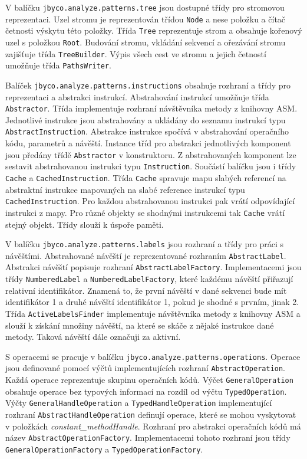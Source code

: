 V balíčku \texttt{jbyco.analyze.patterns.tree} jsou dostupné třídy pro stromovou reprezentaci. Uzel stromu je reprezentován třídou \texttt{Node} a nese položku a čítač četnosti výskytu této položky. Třída \texttt{Tree} reprezentuje strom a obsahuje kořenový uzel s položkou \texttt{Root}. Budování stromu, vkládání sekvencí a ořezávání stromu zajišťuje třída \texttt{TreeBuilder}. Výpis všech cest ve stromu a jejich četností umožňuje třída \texttt{PathsWriter}.

Balíček \texttt{jbyco.analyze.patterns.instructions} obsahuje rozhraní a třídy pro reprezentaci a abstrakci instrukcí. Abstrahování instrukcí umožňuje třída \texttt{Abstractor}. Třída implementuje rozhraní návštěvníka metody z knihovny ASM. Jednotlivé instrukce jsou abstrahovány a ukládány do seznamu instrukcí typu \texttt{AbstractInstruction}. Abstrakce instrukce spočívá v abstrahování operačního kódu, parametrů a návěští. Instance tříd pro abstrakci jednotlivých komponent jsou předány třídě \texttt{Abstractor} v konstruktoru. Z abstrahovaných komponent lze sestavit abstrahovanou instrukci typu \texttt{Instruction}. Součástí balíčku jsou i třídy \texttt{Cache} a \texttt{CachedInstruction}. Třída \texttt{Cache} spravuje mapu slabých referencí na abstraktní instrukce mapovaných na slabé reference instrukcí typu \texttt{CachedInstruction}. Pro každou abstrahovanou instrukci pak vrátí odpovídající instrukci z mapy. Pro různé objekty se shodnými instrukcemi tak \texttt{Cache} vrátí stejný objekt. Třídy slouží k úspoře paměti.

V balíčku \texttt{jbyco.analyze.patterns.labels} jsou rozhraní a třídy pro práci s návěštími. Abstrahované návěští je reprezentované rozhraním \texttt{AbstractLabel}. Abstrakci návěští popisuje rozhraní \texttt{AbstractLabelFactory}. Implementacemi jsou třídy \texttt{NumberedLabel} a \texttt{NumberedLabelFactory}, které každému návěští přiřazují relativní identifikátor. Znamená to, že první návěští v dané sekvenci bude mít identifikátor 1 a druhé návěští identifikátor 1, pokud je shodné s prvním, jinak 2. Třída \texttt{ActiveLabelsFinder} implementuje návštěvníka metody z knihovny ASM a slouží k získání množiny návěští, na které se skáče z nějaké instrukce dané metody. Taková návěští dále označuji za aktivní.

S operacemi se pracuje v balíčku \texttt{jbyco.analyze.patterns.operations}. Operace jsou definované pomocí výčtů implementujících rozhraní \texttt{AbstractOperation}. Každá operace reprezentuje skupinu operačních kódů. Výčet \texttt{GeneralOperation} obsahuje operace bez typových informací na rozdíl od výčtu \texttt{TypedOperation}. Výčty \texttt{GeneralHandleOperation} a \texttt{TypedHandleOperation} implementující rozhraní \texttt{AbstractHandleOperation} definují operace, které se mohou vyskytovat v položkách \textit{constant\_methodHandle}. Rozhraní pro abstrakci operačních kódů má název \texttt{AbstractOperationFactory}. Implementacemi tohoto rozhraní jsou třídy \texttt{GeneralOperationFactory} a \texttt{TypedOperationFactory}. 

